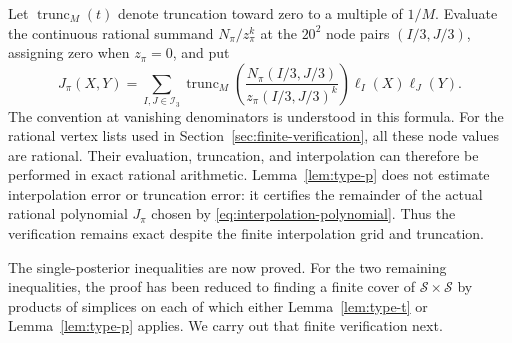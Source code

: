 Let $\operatorname{trunc}_M(t)$ denote truncation toward zero to a
multiple of $1/M$. Evaluate the continuous rational summand
$N_\pi/z_\pi^k$ at the $20^2$ node pairs $(I/3,J/3)$, assigning zero
when $z_\pi=0$, and put
\begin{equation}
 J_\pi(X,Y)=
 \sum_{I,J\in\mathcal I_3}
 \operatorname{trunc}_M\!\left(
   \frac{N_\pi(I/3,J/3)}{z_\pi(I/3,J/3)^k}\right)
 \ell_I(X)\ell_J(Y).
 \label{eq:interpolation-polynomial}
\end{equation}
The convention at vanishing denominators is understood in this
formula. For the rational vertex lists used in
Section~\ref{sec:finite-verification}, all these node values are rational.
Their evaluation, truncation, and interpolation can therefore be performed
in exact rational arithmetic. Lemma~\ref{lem:type-p} does not estimate
interpolation error or truncation error: it certifies the remainder
of the actual rational polynomial $J_\pi$ chosen by
\eqref{eq:interpolation-polynomial}. Thus the verification remains
exact despite the finite interpolation grid and truncation.

The single-posterior inequalities are now proved. For the two
remaining inequalities, the proof has been reduced to finding a
finite cover of $\mathcal S\times\mathcal S$ by products of
simplices on each of which either Lemma~\ref{lem:type-t} or
Lemma~\ref{lem:type-p} applies. We carry out that finite verification
next.

